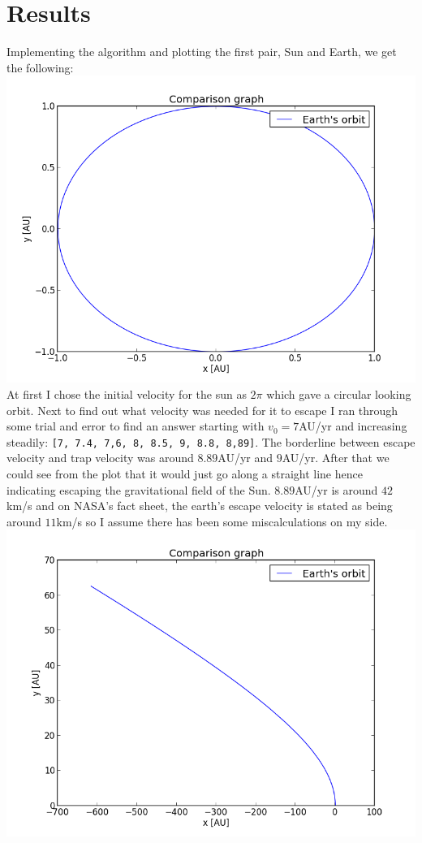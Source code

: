 \documentclass{article}
\begin{document}
\section{Results}
Implementing the algorithm and plotting the first pair, Sun and Earth, we get the following:\\
\includegraphics[scale=0.5]{figure_1.png}\\
At first I chose the initial velocity for the sun as $2\pi$ which gave a circular looking orbit. Next to find out what velocity was needed for it to escape I ran through some trial and error to find an answer starting with $v_0 = 7$AU/yr and increasing steadily: \texttt{[7, 7.4, 7,6, 8, 8.5, 9, 8.8, 8,89]}. The borderline between escape velocity and trap velocity was around $8.89$AU/yr and $9$AU/yr. After that we could see from the plot that it would just go along a straight line hence indicating escaping the gravitational field of the Sun. $8.89$AU/yr is around $42$km/s and on NASA's fact sheet, the earth's escape velocity is stated as being around $11$km/s so I assume there has been some miscalculations on my side.\\
\includegraphics[scale=0.5]{figure_2.png}\\
\end{document}
